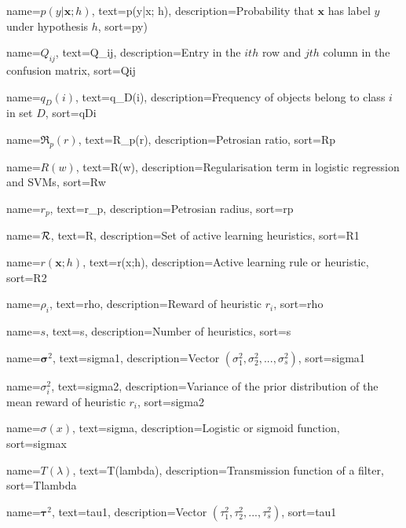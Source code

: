 %
{%
    name={$p(y|\bm{x}; h)$},
    text={p(y|x; h)},
    description={Probability that $\bm{x}$ has label $y$ under hypothesis $h$},
    sort={py)}
}

%
{%
    name={$Q_{ij}$},
    text={Q_ij},
    description={Entry in the $ith$ row and $jth$ column in the confusion matrix},
    sort={Qij}
}

%
{%
	name={$q_D(i)$},
	text={q_D(i)},
	description={Frequency of objects belong to class $i$ in set $D$},
	sort={qDi}
}

%
{%
	name={$\mathfrak{R}_p(r)$},
	text={R_p(r)},
	description={Petrosian ratio},
	sort={Rp}
}

%
{%
    name={$R(w)$},
    text={R(w)},
    description={Regularisation term in logistic regression and SVMs},
    sort={Rw}
}

%
{%
	name={$r_p$},
	text={r_p},
	description={Petrosian radius},
	sort={rp}
}

%
{%
    name={$\mathcal{R}$},
    text={R},
    description={Set of active learning heuristics},
    sort={R1}
}

%
{%
    name={$r(\bm{x}; h)$},
    text={r(x;h)},
    description={Active learning rule or heuristic},
    sort={R2}
}

%
{%
    name={$\rho_i$},
    text={rho},
    description={Reward of heuristic $r_i$},
    sort={rho}
}

%
{%
    name={$s$},
    text={s},
    description={Number of heuristics},
    sort={s}
}

%
{%
    name={$\bm{\sigma}^2$},
    text={sigma1},
    description={Vector $(\sigma^2_1, \sigma^2_2, ..., \sigma^2_s)$},
    sort={sigma1}
}

%
{%
    name={$\sigma_i^2$},
    text={sigma2},
    description={Variance of the prior distribution of the mean reward of heuristic $r_i$},
    sort={sigma2}
}

%
{%
    name={$\sigma(x)$},
    text={sigma},
    description={Logistic or sigmoid function},
    sort={sigmax}
}

%
{%
	name={$T(\lambda)$},
	text={T(lambda)},
	description={Transmission function of a filter},
	sort={Tlambda}
}

%
{%
    name={$\bm{\tau}^2$},
    text={tau1},
    description={Vector $(\tau_1^2, \tau_2^2, ..., \tau_s^2)$},
    sort={tau1}
}

